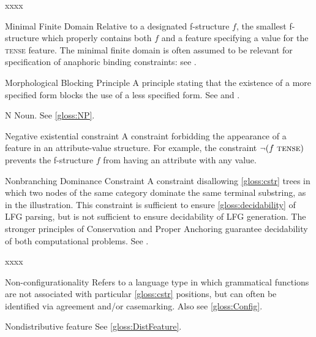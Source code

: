 \documentclass[output=paper,colorlinks,citecolor=brown]{langscibook}
\begin{document}
\begin{labeling}{xxxx}
\item[Minimal Finite Domain] Relative to a designated f-structure $f$, the smallest f-structure which properly contains both $f$ and a feature specifying a value for the \textsc{tense} feature.  The minimal finite domain is often assumed to be relevant for specification of anaphoric binding constraints: see .

\item[Morphological Blocking Principle] A principle stating that the existence of a more specified form blocks the use of a less specified form.  See  and .

\item[N] Noun. See \ref{gloss:NP}.

\item[Negative existential constraint] A constraint forbidding the appearance of a feature in an attribute-value structure.  For example, the constraint $\neg(f~\textsc{tense}{})$ prevents the f-structure $f$ from having an attribute \TENSE with any value.

\item[Nonbranching Dominance Constraint\namedlabel{gloss:NBD}{Nonbranching Dominance Constraint}] A constraint disallowing \ref{gloss:cstr} trees in which two nodes of the same category dominate the same terminal substring, as in the illustration. This constraint is sufficient to ensure \ref{gloss:decidability} of LFG parsing, but is not sufficient to ensure decidability of LFG generation.  The stronger principles of Conservation and Proper Anchoring guarantee decidability of both computational problems.  See .
\end{labeling}\begin{labeling}{xxxx} %
 
\item[Non-configurationality\namedlabel{gloss:Nonconfig}{Non-configurationality}] Refers to a language type in which grammatical functions are not associated with particular \ref{gloss:cstr} positions, but can often be identified via agreement and/or casemarking.  Also see \ref{gloss:Config}.

\item[Nondistributive feature] See \ref{gloss:DistFeature}.


\end{labeling}
\end{document}

